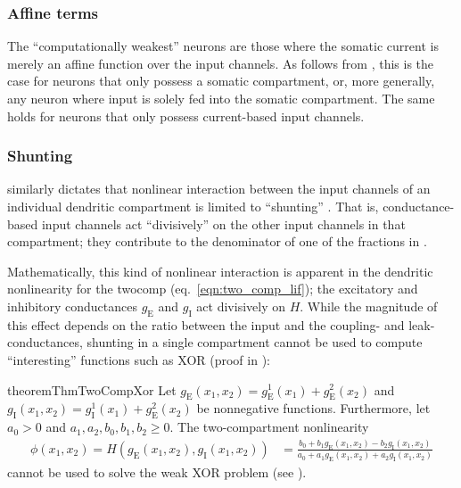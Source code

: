 \subsubsection{Affine terms}
The \enquote{computationally weakest} \nlif neurons are those where the somatic current is merely an affine function over the input channels.
As follows from , this is the case for \nlif neurons that only possess a somatic compartment, or, more generally, any \nlif neuron where input is solely fed into the somatic compartment.
The same holds for \nlif neurons that only possess current-based input channels.

\subsubsection{Shunting}
 similarly dictates that nonlinear interaction between the input channels of an individual dendritic compartment is limited to \enquote{shunting} \citep[cf.][Section~1.5]{koch1999biophysics}.
That is, conductance-based input channels act \enquote{divisively} on the other input channels in that compartment; they contribute to the denominator of one of the fractions in .

Mathematically, this kind of nonlinear interaction is apparent in the dendritic nonlinearity for the \gls{twocomp} (eq.~\ref{eqn:two_comp_lif}); the excitatory and inhibitory conductances $g_\mathrm{E}$ and $g_\mathrm{I}$ act divisively on $H$.
While the magnitude of this effect depends on the ratio between the input and the coupling- and leak-conductances, shunting in a single compartment cannot be used to compute \enquote{interesting} functions such as XOR (proof in ):
\begin{restatable}{theorem}{ThmTwoCompXor}
\label{thm:two_comp_xor}
Let $g_\mathrm{E}(x_1, x_2) = g_\mathrm{E}^1(x_1) + g_\mathrm{E}^2(x_2)$ and $g_\mathrm{I}(x_1, x_2) = g_\mathrm{I}^1(x_1) + g_\mathrm{E}^2(x_2)$ be nonnegative functions.
Furthermore, let $a_0 > 0$ and $a_1, a_2, b_0, b_1, b_2 \geq 0$.
The two-compartment \LIF nonlinearity
\begin{align*}
	\phi(x_1, x_2) = H(g_\mathrm{E}(x_1, x_2), g_\mathrm{I}(x_1, x_2)) &= \frac{b_0 + b_1 g_\mathrm{E}(x_1, x_2) - b_2 g_\mathrm{I}(x_1, x_2)}{a_0 + a_1 g_\mathrm{E}(x_1, x_2) + a_2 g_\mathrm{I}(x_1, x_2)}
\end{align*}
cannot be used to solve the weak XOR problem (see ).
\end{restatable}


